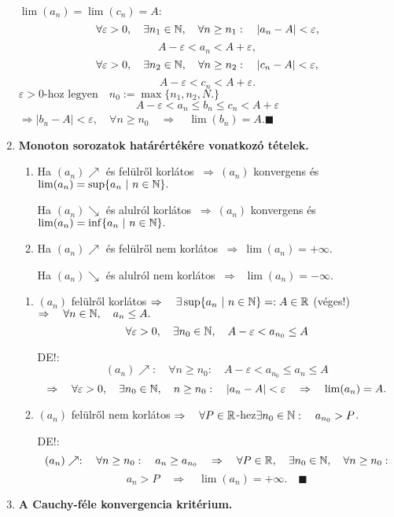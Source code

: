 \documentclass[a4paper,11.5pt]{article}
\begin{document}
\begin{enumerate}
		\biz $\lim(a_n)=\lim(c_n)=A:\quad $
		\[\forall \varepsilon>0,\quad \exists n_1\in\mathbb{N},\quad \forall n\geq n_1:\quad |a_n-A|<\varepsilon,\]
		\[ A-\varepsilon<a_n<A+\varepsilon, \]
		\[\forall \varepsilon>0,\quad \exists n_2\in\mathbb{N},\quad \forall n\geq n_2:\quad |c_n-A|<\varepsilon,\]
		\[ A-\varepsilon<c_n<A+\varepsilon. \]
		$ \varepsilon>0\text{-hoz legyen}\quad n_0:=\max\{ n_1,n_2,N. \} $
		\[ A-\varepsilon<a_n\leq b_n\leq c_n<A+\varepsilon \]
		$\Rightarrow $\quad $|b_n-A|<\varepsilon,\quad \forall n\geq n_0\quad \Rightarrow\quad \lim(b_n)=A$.\quad $\blacksquare$
		\item \textbf{Monoton sorozatok határértékére vonatkozó tételek.}
		
		\begin{enumerate}
			\item Ha $(a_n)\nearrow$ és felülről korlátos $\ \Rightarrow\  (a_n)$ konvergens és $\lim(a_n)=\sup\{a_n\ |\ n\in\mathbb{N} \}.$
			
			Ha $(a_n)\searrow$ és alulról korlátos $\ \Rightarrow\  (a_n)$ konvergens és $\lim(a_n)=\inf\{a_n\ |\ n\in\mathbb{N} \}.$
			\item Ha $(a_n)\nearrow$ és felülről nem korlátos $\ \Rightarrow\ \lim(a_n)=+\infty.$
			
			Ha $(a_n)\searrow$ és alulról nem korlátos $\ \Rightarrow\ $ $\lim(a_n)=-\infty.$
		\end{enumerate}
		
		\biz 
		\begin{enumerate}
			\item $(a_n)$ felülről korlátos \quad $\Rightarrow\quad \exists\sup\{a_n\ |\ n\in\mathbb{N} \}=:A\in\mathbb{R}$ (véges!)\quad $\Rightarrow\quad \forall n\in\mathbb{N},\quad  a_n\leq A.$
			\[\forall \varepsilon>0,\quad  \exists n_0\in\mathbb{N},\quad A-\varepsilon<a_{n_0}\leq A\]
			
			DE!:\[ (a_n)\nearrow:\quad \forall n\geq n_0:\quad A-\varepsilon<a_{n_0}\leq a_n\leq A\]
			\[ \Rightarrow \quad \forall\varepsilon>0,\quad \exists n_0\in\mathbb{N},\quad n\geq n_0: \quad |a_n-A|<\varepsilon\quad \Rightarrow\quad \lim(a_n)=A. \]
			
			
			
			\item $(a_n)$ felülről nem korlátos \quad $\Rightarrow\quad \forall P\in\mathbb{R}$-hez\quad $\exists n_0\in\mathbb{N}:\quad a_{n_0}>P$.
			
			DE!:
			\[ (a_n)\nearrow:\quad \forall n\geq n_0:\quad a_n\geq a_{n_0}\quad \Rightarrow\quad \forall P\in\mathbb{R}, \quad \exists n_0\in\mathbb{N},\quad  \forall n\geq n_0: \]
			\[ a_n>P\quad \Rightarrow\quad \lim(a_n)=+\infty.\quad \blacksquare \]
		\end{enumerate}
		\item \textbf{A Cauchy-féle konvergencia kritérium.}
		

\end{enumerate}
\end{document}
